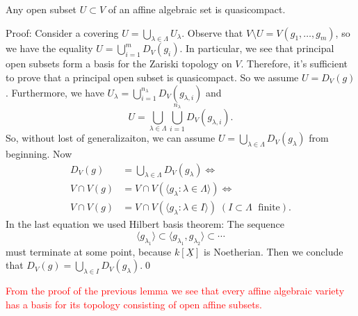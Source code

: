 \begin{dang}
    \begin{lemma}
        Any open subset $U\subset V$ of an affine algebraic set is quasicompact. 
    \end{lemma}
\end{dang}
Proof: Consider a covering $U=\bigcup_{\lambda\in\Lambda}U_\lambda$.
Observe that $V\setminus U=V(g_1,\dots, g_m)$, so we have the equality $U=\bigcup_{i=1}^m D_V(g_i)$. In particular, we see 
that principal open subsets form a basis for the Zariski topology on $V$. Therefore, 
it's sufficient to prove that a principal open subset is quasicompact. So we assume $U=D_V(g)$. Furthermore, we have 
$U_\lambda = \bigcup_{i=1}^{n_\lambda}D_V(g_{\lambda,i})$ and 
\begin{equation}
    U=\bigcup_{\lambda\in\Lambda}\bigcup_{i=1}^{n_\lambda}D_V(g_{\lambda,i}).
\end{equation}
So, without lost of generalizaiton, we can assume $U=\bigcup_{\lambda\in\Lambda}D_V(g_\lambda)$ from beginning. Now 
\begin{equation}
    \begin{split}
        D_V(g) & = \bigcup_{\lambda\in\Lambda}D_V(g_\lambda)\iff\\
      V\cap V(g) &= V\cap V(\langle g_\lambda:\lambda\in\Lambda\rangle)\iff\\ 
      V\cap V(g) &= V\cap V(\langle g_\lambda:\lambda\in I\rangle)\;(I\subset \Lambda\;\text{ finite}).
    \end{split}
\end{equation}
In the last equation we used Hilbert basis theorem: The sequence
\begin{equation}
    \langle g_{\lambda_1} \rangle \subset  \langle g_{\lambda_1},g_{\lambda_2} \rangle \subset \cdots 
\end{equation}
must terminate at some point, because $k[\underline{X}]$ is Noetherian. Then we conclude that 
$D_V(g)=\bigcup_{\lambda\in I}D_V(g_\lambda)$.\qed
\begin{dang}
    \begin{corollary}
         \textcolor{red}{From the proof of the previous lemma we see that every affine algebraic variety has a basis for its topology 
        consisting of open affine subsets.}
    \end{corollary}
\end{dang}

